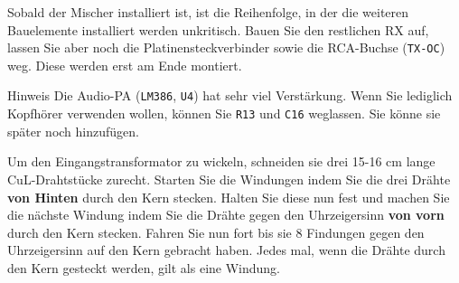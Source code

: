 \documentclass[10pt, a4paper,twoside]{scrartcl}
\newenvironment{remark}{\begin{bclogo}[couleur=blue!30,arrondi=.1,logo=\bcinfo,ombre=true]{Hinweis}}{\end{bclogo}}
\begin{document}
Sobald der Mischer installiert ist, ist die Reihenfolge, in der die  weiteren Bauelemente installiert werden unkritisch. Bauen Sie den restlichen RX auf, lassen Sie aber noch die Platinensteckverbinder sowie die RCA-Buchse (\texttt{TX-OC}) weg. Diese werden erst am Ende montiert.

\begin{remark}
Die Audio-PA (\texttt{LM386}, \texttt{U4}) hat sehr viel Verstärkung. Wenn Sie lediglich Kopfhörer verwenden wollen, können Sie \texttt{R13} und \texttt{C16} weglassen. Sie könne sie später noch hinzufügen.
\end{remark}

Um den Eingangstransformator zu wickeln, schneiden sie drei 15-16 cm lange CuL-Drahtstücke zurecht. Starten Sie die Windungen indem Sie die drei Drähte \textbf{von Hinten} durch den Kern stecken. Halten Sie diese nun fest und machen Sie die nächste Windung indem Sie die Drähte gegen den Uhrzeigersinn \textbf{von vorn} durch den Kern stecken. Fahren Sie nun fort bis sie 8 Findungen gegen den Uhrzeigersinn auf den Kern gebracht haben. Jedes mal, wenn die Drähte durch den Kern gesteckt werden, gilt als eine Windung.
\end{document}
